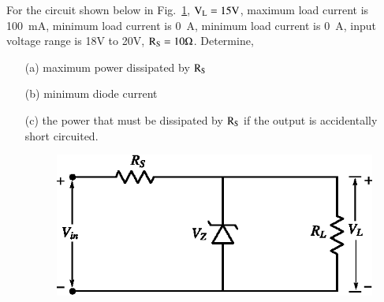 \begin{problem}\label{prob1.33}
For the circuit shown below in Fig.~\ref{fig1.51}, $\textrm{V}_{\textrm{L}}=15\textrm{V}$, maximum load current is 100~mA, minimum load current is 0~A, minimum load current is 0~A, input voltage range is 18V to 20V, $\textrm{R}_{\textrm{S}}=10\Omega$. Determine,
\begin{itemize}
\item[(a)] maximum power dissipated by $\textrm{R}_{\textrm{S}}$

\item[(b)] minimum diode current

\item[(c)] the power that must be dissipated by $\textrm{R}_{\textrm{S}}$ if the output is accidentally short circuited.
\begin{figure}[H]
\centering
\includegraphics{chap1/fig1.51.eps}
\caption{}\label{fig1.51}
\end{figure}
\end{itemize}
\end{problem}

